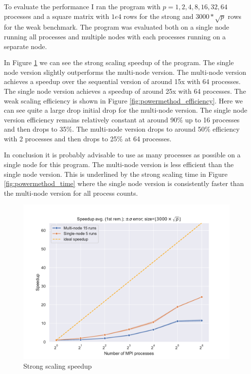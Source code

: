 \documentclass[unicode,11pt,a4paper,oneside,numbers=endperiod,openany]{scrartcl}
\begin{document}
To evaluate the performance I ran the program with $p = 1, 2, 4, 8, 16, 32, 64$ processes and a square matrix with $1e4$ rows for the strong and $3000 * \sqrt{p}$ rows for the weak benchmark. The program was evaluated both on a single node running all processes and multiple nodes with each processes running on a separate node.

In Figure \ref{fig:powermethod_speedup} we can see the strong scaling speedup of the program. The single node version slightly outperforms the multi-node version. The multi-node version achieves a speedup over the sequential version of around 15x with 64 processes. The single node version achieves a speedup of around 25x with 64 processes. The weak scaling efficiency is shown in Figure \ref{fig:powermethod_efficiency}. Here we can see quite a large drop initial drop for the multi-node version. The single node version efficiency remains relatively constant at around 90\% up to 16 processes and then drops to 35\%. The multi-node version drops to around 50\% efficiency with 2 processes and then drops to 25\% at 64 processes.

In conclusion it is probably advisable to use as many processes as possible on a single node for this program. The multi-node version is less efficient than the single node version. This is underlined by the strong scaling time in Figure \ref{fig:powermethod_time} where the single node version is consistently faster than the multi-node version for all process counts.

\begin{figure}
      \centering
      \includegraphics[width=1\linewidth]{plots/power_strong_speedup.pdf}
      \caption{Strong scaling speedup}
      \label{fig:powermethod_speedup}
\end{figure}
\end{document}
